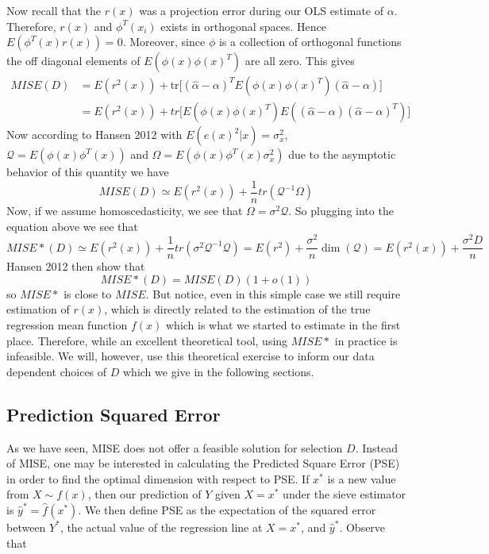 \documentclass[12pt]{article}  %
\begin{document}
Now recall that the $r(x)$ was a projection error during our OLS estimate of $\alpha$. Therefore, $r(x)$ and $\phi^{T}(x_i)$ exists in orthogonal spaces. Hence $E(\phi^{T}(x)r(x)) = 0$. Moreover, since $\phi$ is a collection of orthogonal functions the off diagonal elements of $E(\phi(x)\phi(x)^T)$ are all zero. This gives 
\begin{align*}
MISE(D) &= E(r^{2}(x)) + \text{tr}\Big[(\hat{\alpha} - \alpha)^TE(\phi(x)\phi(x)^T)(\hat{\alpha} - \alpha)\Big]\\
&= E(r^{2}(x)) + tr\Big[E(\phi(x)\phi(x)^{T})E\left((\hat{\alpha} - \alpha)(\hat{\alpha} - \alpha)^{T}\right)\Big]
\end{align*}
Now according to Hansen 2012 with $E(e(x)^2|x) = \sigma_x^2$, $\mathcal{Q} = E(\phi(x)\phi^T(x))$ and $\Omega = E(\phi(x)\phi^T(x)\sigma_x^2)$ due to the asymptotic behavior of this quantity we have 
$$MISE(D)\simeq E(r^2(x)) + \frac{1}{n}tr\left(\mathcal{Q}^{-1}\Omega\right)$$
Now, if we assume homoscedasticity, we see that $\Omega = \sigma^2\mathcal{Q}$. So plugging into the equation above we see that 
$$MISE*(D)\simeq E(r^2(x)) + \frac{1}{n}tr\left(\sigma^2\mathcal{Q}^{-1}\mathcal{Q}\right) = E(r^2) + \frac{\sigma^2}{n}\dim(\mathcal{Q}) = E(r^2(x)) + \frac{\sigma^2 D}{n}$$
Hansen 2012 then show that $$MISE*(D) = MISE(D)(1 + o(1))$$ so $MISE*$ is close to $MISE$. But notice, even in this simple case we still require estimation of $r(x)$, which is directly related to the estimation of the true regression mean function $f(x)$ which is what we started to estimate in the first place. Therefore, while an excellent theoretical tool, using $MISE*$ in practice is infeasible. We will, however, use this theoretical exercise to inform our data dependent choices of $D$ which we give in the following sections.

\subsection{Prediction Squared Error}

As we have seen, MISE does not offer a feasible solution for selection $D$. Instead of MISE, one may be interested in calculating the Predicted Square Error (PSE) in order to find the optimal dimension with respect to PSE. If $x^*$  is a new value from $X \sim f(x)$, then our prediction of $Y$ given $X = x^*$ under the sieve estimator is $\hat{y}^* = \hat{f}(x^*)$. We then define PSE as the expectation of the squared error between $Y^*$, the actual value of the regression line at $X=x^*$, and $\hat{y}^*$. Observe that
\end{document}
